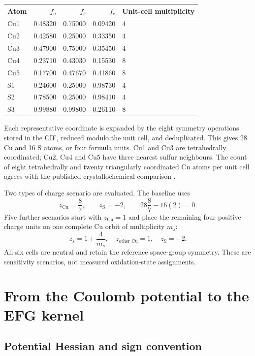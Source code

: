 \documentclass[11pt,a4paper]{article}
\begin{document}
\begin{center}
\begin{tabular}{lrrrl}
\toprule
Atom & $f_a$ & $f_b$ & $f_c$ & Unit-cell multiplicity \\
\midrule
Cu1 & 0.48320 & 0.75000 & 0.09420 & 4 \\
Cu2 & 0.42580 & 0.25000 & 0.33350 & 4 \\
Cu3 & 0.47900 & 0.75000 & 0.35450 & 4 \\
Cu4 & 0.23710 & 0.43030 & 0.15530 & 8 \\
Cu5 & 0.17700 & 0.47670 & 0.41860 & 8 \\
S1 & 0.24600 & 0.25000 & 0.98730 & 4 \\
S2 & 0.78500 & 0.25000 & 0.98410 & 4 \\
S3 & 0.99880 & 0.99800 & 0.26110 & 8 \\
\bottomrule
\end{tabular}
\end{center}

Each representative coordinate is expanded by the eight symmetry operations
stored in the CIF, reduced modulo the unit cell, and deduplicated. This gives
28 Cu and 16 S atoms, or four formula units. Cu1 and Cu3 are tetrahedrally
coordinated; Cu2, Cu4 and Cu5 have three nearest sulfur neighbours. The count of
eight tetrahedrally and twenty triangularly coordinated Cu atoms per unit cell
agrees with the published crystallochemical comparison \cite{Evans1981}.

Two types of charge scenario are evaluated. The baseline uses
\begin{equation}
 z_{\mathrm{Cu}}=\frac87,\qquad z_{\mathrm S}=-2,\qquad
 28\frac87-16(2)=0.
\label{eq:neutral}
\end{equation}
Five further scenarios start with $z_{\mathrm{Cu}}=1$ and place the remaining
four positive charge units on one complete Cu orbit of multiplicity $m_s$:
\begin{equation}
 z_s=1+\frac4{m_s},\quad z_{\text{other Cu}}=1,
 \quad z_{\mathrm S}=-2.
\end{equation}
All six cells are neutral and retain the reference space-group symmetry. These
are sensitivity scenarios, not measured oxidation-state assignments.

\section{From the Coulomb potential to the EFG kernel}

\subsection{Potential Hessian and sign convention}
\end{document}
